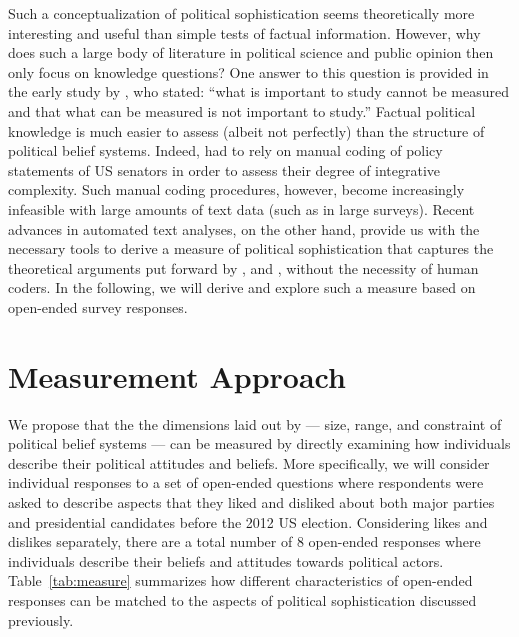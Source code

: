 \documentclass[12pt]{article}
\begin{document}
Such a conceptualization of political sophistication seems theoretically more interesting and useful than simple tests of factual information. However, why does such a large body of literature in political science and public opinion then only focus on knowledge questions? One answer to this question is provided in the early study by \citet[206]{converse1964nature}, who stated: ``what is important to study cannot be measured and that what can be measured is not important to study.'' Factual political knowledge is much easier to assess (albeit not perfectly) than the structure of political belief systems. Indeed, \citet{tetlock1983cognitive} had to rely on manual coding of policy statements of US senators in order to assess their degree of integrative complexity. Such manual coding procedures, however, become increasingly infeasible with large amounts of text data (such as in large surveys). Recent advances in automated text analyses, on the other hand, provide us with the necessary tools to derive a measure of political sophistication that captures the theoretical arguments put forward by \citet{converse1964nature}, \citet{tetlock1983cognitive} and \citet{luskin1987measuring}, without the necessity of human coders. In the following, we will derive and explore such a measure based on open-ended survey responses.


\section{Measurement Approach}

We propose that the the dimensions laid out by \citet{luskin1987measuring} --- size, range, and constraint of political belief systems --- can be measured by directly examining how individuals describe their political attitudes and beliefs. More specifically, we will consider individual responses to a set of open-ended questions where respondents were asked to describe aspects that they liked and disliked about both major parties and presidential candidates before the 2012 US election. Considering likes and dislikes separately, there are a total number of 8 open-ended responses where individuals describe their beliefs and attitudes towards political actors. Table~\ref{tab:measure} summarizes how different characteristics of open-ended responses can be matched to the aspects of political sophistication discussed previously.
\end{document}
